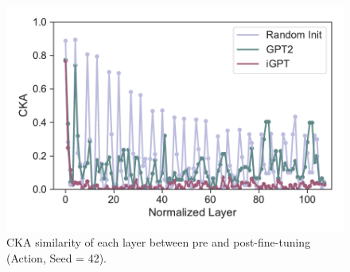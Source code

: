 \documentclass{article}
\begin{document}
\begin{figure}[H]
\begin{minipage}[b]{0.32\linewidth}
        \includegraphics[width=\linewidth]{figs/cka_plot_40_gpt2_igpt_dt_walker2d_medium_42_action.pdf}
    \end{minipage}
    \caption{CKA similarity of each layer between pre and post-fine-tuning (Action, Seed = 42).}
\end{figure}
\end{document}
